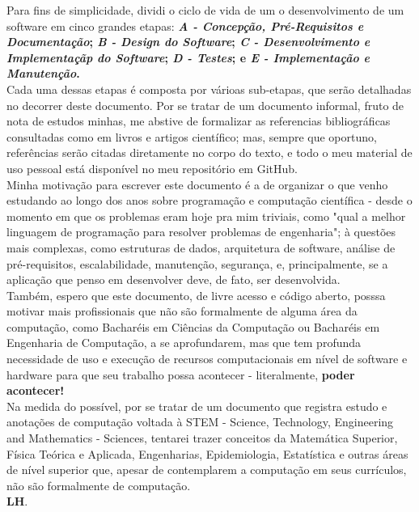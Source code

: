 Para fins de simplicidade, dividi o ciclo de vida de um o desenvolvimento de um 
software em cinco grandes etapas: {\textbf{\textit{A - Concepção, Pré-Requisitos e Documentação};
\textit{B - Design do Software}; \textit{C - Desenvolvimento e Implementaçãp do Software}; 
\textit{D - Testes}; e \textit{E - Implementação e Manutenção}.}} \\

Cada uma dessas etapas é composta por várioas sub-etapas, que serão detalhadas no decorrer
deste documento. Por se tratar de um documento informal, fruto de nota de estudos minhas,
me abstive de formalizar as referencias bibliográficas consultadas como em livros e artigos
científico; mas, sempre que oportuno, referências serão citadas diretamente no corpo do texto,
e todo o meu material de uso pessoal está disponível no meu repositório em GitHub. \\

Minha motivação para escrever este documento é a de organizar o que venho estudando ao longo dos anos 
sobre programação e computação científica - desde o momento em que os problemas eram hoje pra mim triviais,
como "qual a melhor linguagem de programação para resolver problemas de engenharia"; à questões mais complexas,
como estruturas de dados, arquitetura de software, análise de pré-requisitos, escalabilidade, manutenção, segurança,
e, principalmente, se a aplicação que penso em desenvolver deve, de fato, ser desenvolvida. \\

Também, espero que este documento, de livre acesso e código aberto, posssa motivar mais profissionais que não são formalmente
de alguma área da computação, como Bacharéis em Ciências da Computação ou Bacharéis em Engenharia de Computação, a se aprofundarem,
mas que tem profunda necessidade de uso e execução de recursos computacionais em nível de software e hardware 
para que seu trabalho possa acontecer - literalmente, \textbf{poder acontecer!} \\

Na medida do possível, por se tratar de um documento que registra estudo e anotações de computação voltada
à STEM - Science, Technology, Engineering and Mathematics - Sciences, tentarei trazer conceitos da Matemática Superior,
Física Teórica e Aplicada, Engenharias, Epidemiologia, Estatística e outras áreas de nível superior que, apesar de contemplarem
a computação em seus currículos, não são formalmente de computação. \\

\textbf{LH}.
